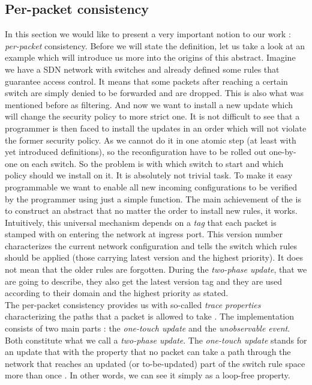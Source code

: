\documentclass{article}
\theoremstyle{remark}
\begin{document}
\subsection{Per-packet consistency}
In this section we would like to present a very important notion to our work : \emph{per-packet} consistency. Before we will state the  definition, let us take a look at an example which will introduce us more into the origins of this abstract.
Imagine we have a SDN network with switches and already defined some rules that guarantee  access control. It means that some packets after reaching a certain switch are simply denied to be forwarded and are dropped. This is also what was mentioned before as filtering. And now we want to install a new update which will change  the security policy to more strict one. It is not difficult to see that a programmer is then faced to install the updates in an order which will not violate the former security policy. As we cannot do it in one atomic step (at least with yet introduced definitions), so the reconfiguration have to be rolled out one-by-one on each switch. So the problem is with which switch to start and which policy should we install on it. It is absolutely not trivial task.
To make it easy programmable we want to enable all new incoming configurations to be verified by the programmer using just a simple function. The main achievement of the \cite{Reitblatt:2012:ANU:2342356.2342427} is to construct an abstract that no matter the order to install new rules, it works. Intuitively, this universal mechanism depends on a \emph{tag} that each packet is stamped with on entering the network at ingress port. This version number characterizes the current network configuration and tells the switch which rules should be applied (those carrying latest version and the highest priority). It does not mean that the older rules are forgotten. During the \emph{two-phase update}, that we are going to describe, they also get the latest version tag and they are used according to their domain and the highest priority as stated.\\
The per-packet consistency provides us with so-called \emph{trace properties} characterizing the paths that a packet is allowed to take \cite{Reitblatt:2012:ANU:2342356.2342427}. 
The implementation consists of two main parts : the \emph{one-touch update} and the \emph{unobservable event}. Both constitute what we call a \emph{two-phase update}. 
The \emph{one-touch update} stands for an update that with the property that no packet can take a path through the network that reaches an updated (or to-be-updated) part of the switch rule space more than once \cite{Reitblatt:2012:ANU:2342356.2342427}. In other words, we can see it simply as a loop-free property.
\end{document}
